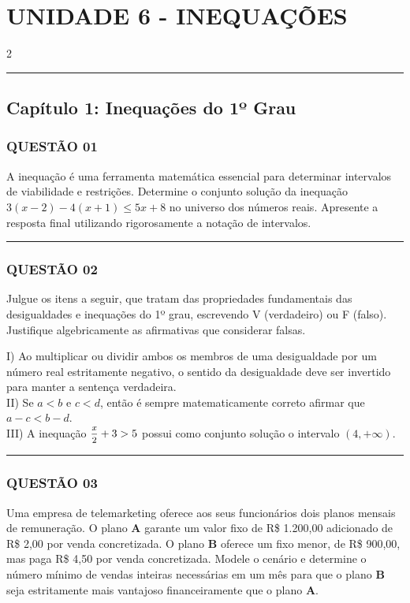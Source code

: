 \documentclass[11pt, a4paper]{article}
\begin{document}
\raggedcolumns
\section*{UNIDADE 6 - INEQUAÇÕES}
\begin{multicols*}{2}

\vspace{0cm} \noindent\textcolor{CorLinha}{\rule{\linewidth}{0.5pt}} \vspace{-0.2cm}
\subsection*{Capítulo 1: Inequações do 1º Grau}
\subsubsection*{QUESTÃO 01}
A inequação é uma ferramenta matemática essencial para determinar intervalos de viabilidade e restrições. Determine o conjunto solução da inequação $ 3(x - 2) - 4(x + 1) \le 5x + 8 $ no universo dos números reais. Apresente a resposta final utilizando rigorosamente a notação de intervalos.

\vspace{0cm} \noindent\textcolor{CorLinha}{\rule{\linewidth}{0.5pt}} \vspace{-0.2cm}
\subsubsection*{QUESTÃO 02}
Julgue os itens a seguir, que tratam das propriedades fundamentais das desigualdades e inequações do 1º grau, escrevendo V (verdadeiro) ou F (falso). Justifique algebricamente as afirmativas que considerar falsas.

I) Ao multiplicar ou dividir ambos os membros de uma desigualdade por um número real estritamente negativo, o sentido da desigualdade deve ser invertido para manter a sentença verdadeira.\\[0.3cm]
II) Se $ a < b $ e $ c < d $, então é sempre matematicamente correto afirmar que $ a - c < b - d $.\\[0.3cm]
III) A inequação $ \mfrac{x}{2} + 3 > 5 $ possui como conjunto solução o intervalo $ (4, +\infty) $.

\vspace{0cm} \noindent\textcolor{CorLinha}{\rule{\linewidth}{0.5pt}} \vspace{-0.2cm}
\subsubsection*{QUESTÃO 03}
Uma empresa de telemarketing oferece aos seus funcionários dois planos mensais de remuneração. O plano \textbf{A} garante um valor fixo de R\$ 1.200,00 adicionado de R\$ 2,00 por venda concretizada. O plano \textbf{B} oferece um fixo menor, de R\$ 900,00, mas paga R\$ 4,50 por venda concretizada. Modele o cenário e determine o número mínimo de vendas inteiras necessárias em um mês para que o plano \textbf{B} seja estritamente mais vantajoso financeiramente que o plano \textbf{A}.


\end{multicols*}
\end{document}
